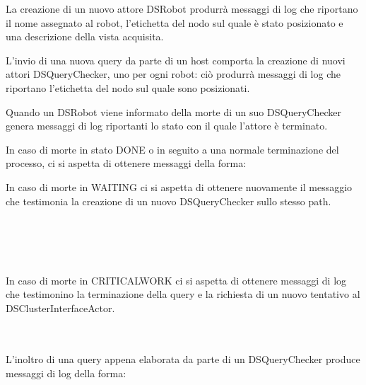 La creazione di un nuovo attore DSRobot produrrà messaggi di log che riportano
il nome assegnato al robot, l'etichetta del nodo sul quale è stato posizionato
e una descrizione della vista acquisita.\\


L'invio di una nuova query da parte di un host comporta la creazione di nuovi attori DSQueryChecker,
uno per ogni robot: ciò produrrà messaggi di log che riportano
l'etichetta del nodo sul quale sono posizionati.\\


Quando un DSRobot viene informato della morte di un suo DSQueryChecker
genera messaggi di log riportanti lo stato con il quale l'attore è terminato.

In caso di morte in stato DONE o in seguito a una normale terminazione del
processo, ci si aspetta di ottenere messaggi della forma:\\

In caso di morte in WAITING ci si aspetta di ottenere nuovamente il messaggio
che testimonia la creazione di un nuovo DSQueryChecker sullo stesso path.\\
\\
\printlog{[...]}\\
\\
\printlog{[...]}\\

In caso di morte in CRITICALWORK ci si aspetta di ottenere messaggi di log
che testimonino la terminazione della query e la richiesta di un nuovo
tentativo al DSClusterInterfaceActor.\\
\\
\printlog{[...]}\\

L'inoltro di una query appena elaborata da parte di un DSQueryChecker produce
messaggi di log della forma:\\

